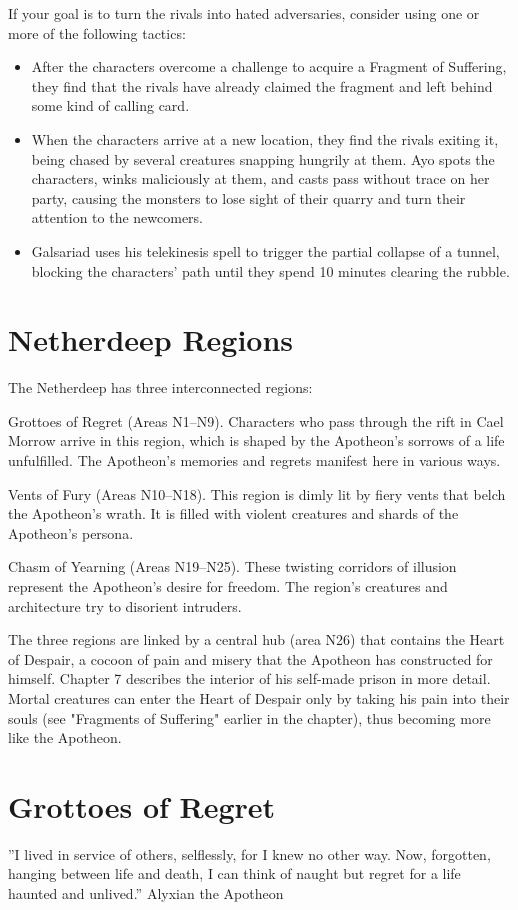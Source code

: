 \documentclass[10pt,a4paper,twoside,twocolumn,openany,nodeprecatedcode]{dndbook}
\begin{document}
If your goal is to turn the rivals into hated adversaries, consider using one or more of the following tactics:


\begin{itemize}
\item After the characters overcome a challenge to acquire a Fragment of Suffering, they find that the rivals have already claimed the fragment and left behind some kind of calling card.
\item When the characters arrive at a new location, they find the rivals exiting it, being chased by several creatures snapping hungrily at them. Ayo spots the characters, winks maliciously at them, and casts pass without trace on her party, causing the monsters to lose sight of their quarry and turn their attention to the newcomers.
\item Galsariad uses his telekinesis spell to trigger the partial collapse of a tunnel, blocking the characters' path until they spend 10 minutes clearing the rubble.
\end{itemize}

\section{Netherdeep Regions}
The Netherdeep has three interconnected regions:

Grottoes of Regret (Areas N1–N9). Characters who pass through the rift in Cael Morrow arrive in this region, which is shaped by the Apotheon's sorrows of a life unfulfilled. The Apotheon's memories and regrets manifest here in various ways.

Vents of Fury (Areas N10–N18). This region is dimly lit by fiery vents that belch the Apotheon's wrath. It is filled with violent creatures and shards of the Apotheon's persona.

Chasm of Yearning (Areas N19–N25). These twisting corridors of illusion represent the Apotheon's desire for freedom. The region's creatures and architecture try to disorient intruders.

The three regions are linked by a central hub (area N26) that contains the Heart of Despair, a cocoon of pain and misery that the Apotheon has constructed for himself. Chapter 7 describes the interior of his self-made prison in more detail. Mortal creatures can enter the Heart of Despair only by taking his pain into their souls (see "Fragments of Suffering" earlier in the chapter), thus becoming more like the Apotheon.

\section{Grottoes of Regret}
\DndQuote%
{}
{''I lived in service of others, selflessly, for I knew no other way. Now, forgotten, hanging between life and death, I can think of naught but regret for a life haunted and unlived.''}
{Alyxian the Apotheon}
\end{document}
